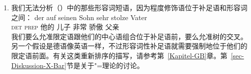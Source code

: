 \begin{enumerate}
\item 我们无法分析（）中的那些形容词短语，因为程度修饰语位于补足语和形容词之间：
\ea
\gll der auf seinen Sohn sehr stolze Vater\\
	 \textsc{det} \textsc{prep} 他的 儿子 非常 骄傲 父亲\\
\z
我们要么允准限定语跟他们的中心语组合位于补足语前，要么允准树的交叉。另一个假设是德语像英语一样，不过形容词性补足语就需要强制地位于他们的限定语前面。有关这类重新排序的描写，请参考第~\ref{Kapitel-GB}章。第~\ref{sec-Diskussion-X-Bar}节是关于\xbar "=理论的讨论。


\end{enumerate}
